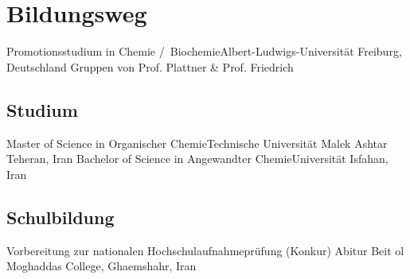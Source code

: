 

\section{Bildungsweg}

 {Promotionsstudium in Chemie \slash  ~Biochemie}{Albert-Ludwigs-Universität Freiburg, Deutschland \newline Gruppen von Prof. Plattner \& Prof. Friedrich}{}{}{}







\subsection{Studium}
 {Master of Science in Organischer Chemie}{Technische Universität Malek Ashtar Teheran, Iran}{}{}{}
 {Bachelor of Science in Angewandter Chemie}{Universität Isfahan, Iran}{}{}{}

\subsection{Schulbildung}
 {Vorbereitung zur nationalen Hochschulaufnahmeprüfung (Konkur)}{}{}{}{}
 {Abitur}{
}{Beit ol Moghaddas College, Ghaemshahr, Iran}{}{}{}



